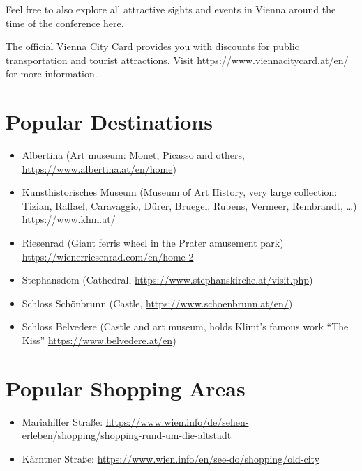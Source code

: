 Feel free to also explore all attractive sights and events in Vienna around the time of the conference here.

The official Vienna City Card provides you with discounts for public transportation and tourist attractions. Visit \url{https://www.viennacitycard.at/en/} for more information.

\section*{Popular Destinations}
\begin{itemize}

\item Albertina (Art museum: Monet, Picasso and others, \\
\url{https://www.albertina.at/en/home})

\item Kunsthistorisches Museum (Museum of Art History, very large collection: Tizian, Raffael, Caravaggio, Dürer, Bruegel, Rubens, Vermeer, Rembrandt, …) \url{https://www.khm.at/}

\item Riesenrad (Giant ferris wheel in the Prater amusement park)\\ 
\url{https://wienerriesenrad.com/en/home-2}

\item Stephansdom (Cathedral, \url{https://www.stephanskirche.at/visit.php})

\item Schloss Schönbrunn (Castle, \url{https://www.schoenbrunn.at/en/})

\item Schloss Belvedere (Castle and art museum, holds Klimt’s famous work “The Kiss” \url{https://www.belvedere.at/en})
\end{itemize}

\section*{Popular Shopping Areas}
\begin{itemize}

\item Mariahilfer Straße: \url{https://www.wien.info/de/sehen-erleben/shopping/shopping-rund-um-die-altstadt}

\item Kärntner Straße: \url{https://www.wien.info/en/see-do/shopping/old-city}

\end{itemize}
